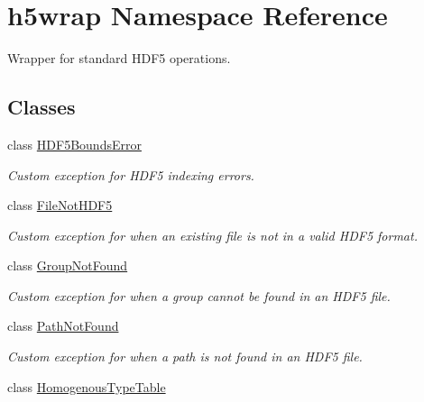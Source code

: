 \hypertarget{namespaceh5wrap}{\section{h5wrap Namespace Reference}
\label{namespaceh5wrap}
}


Wrapper for standard H\-D\-F5 operations.  


\subsection*{Classes}
\begin{DoxyCompactItemize}
\item 
class \hyperlink{classh5wrap_1_1_h_d_f5_bounds_error}{H\-D\-F5\-Bounds\-Error}
\begin{DoxyCompactList}\small\item\em Custom exception for H\-D\-F5 indexing errors. \end{DoxyCompactList}\item 
class \hyperlink{classh5wrap_1_1_file_not_h_d_f5}{File\-Not\-H\-D\-F5}
\begin{DoxyCompactList}\small\item\em Custom exception for when an existing file is not in a valid H\-D\-F5 format. \end{DoxyCompactList}\item 
class \hyperlink{classh5wrap_1_1_group_not_found}{Group\-Not\-Found}
\begin{DoxyCompactList}\small\item\em Custom exception for when a group cannot be found in an H\-D\-F5 file. \end{DoxyCompactList}\item 
class \hyperlink{classh5wrap_1_1_path_not_found}{Path\-Not\-Found}
\begin{DoxyCompactList}\small\item\em Custom exception for when a path is not found in an H\-D\-F5 file. \end{DoxyCompactList}\item 
class \hyperlink{classh5wrap_1_1_homogenous_type_table}{Homogenous\-Type\-Table}
\end{DoxyCompactItemize}
